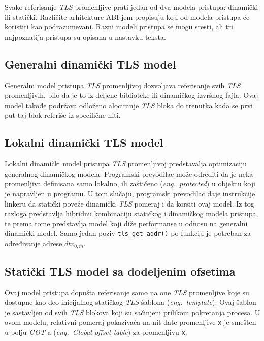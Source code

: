 \documentclass[12pt,oneside]{memoir}
\begin{document}
Svako referisanje \emph{TLS} promenljive prati jedan od dva modela pristupa: dinamički ili statički. Različite arhitekture ABI-jem propisuju koji od modela pristupa će koristiti kao podrazumevani. Razni modeli pristupa se mogu sresti, ali tri najpoznatija pristupa su opisana u nastavku teksta.

\subsection{Generalni dinamički TLS model}

Generalni model pristupa \emph{TLS} promenljivoj dozvoljava referisanje svih \emph{TLS} promenljivih, bilo da je to iz deljene biblioteke ili dinamičkog izvršnog fajla. Ovaj model takođe podržava odloženo alociranje \emph{TLS} bloka do trenutka kada se prvi put taj blok referiše iz specifične niti.

\subsection{Lokalni dinamički TLS model}

Lokalni dinamički model pristupa \emph{TLS} promenljivoj predstavalja optimizaciju generalnog dinamičkog modela. Programski prevodilac može odrediti da je neka promenljiva definisana samo lokalno, ili zaštićeno (\emph{eng.~protected}) u objektu koji je napravljen u programu. U tom slučaju, programski prevodilac daje instrukcije linkeru da statički poveže dinamički \emph{TLS} pomeraj i da korsiti ovaj model. Iz tog razloga predstavlja hibridnu kombinaciju statičkog i dinamičkog modela pristupa, te prema tome predstavlja model koji diže performanse u odnosu na generalni dinamički model. Samo jedan poziv \texttt{tls\_get\_addr()} po funkciji je potreban za određivanje adrese \texttt{$dtv_{0,m}$}.

\subsection{Statički TLS model sa dodeljenim ofsetima}

Ovaj model pristupa dopušta referisanje samo na one \emph{TLS} promenljive koje su dostupne kao deo inicijalnog statičkog \emph{TLS} šablona (\emph{eng.~template}). Ovaj šablon je sastavljen od svih \emph{TLS} blokova koji su sačinjeni prilikom pokretanja procesa. U ovom modelu, relativni pomeraj pokazivača na nit date promenljive \texttt{x} je smešten u polju \emph{GOT}-a (\emph{eng.~Global offset table}) za promenljivu \texttt{x}.
\end{document}

